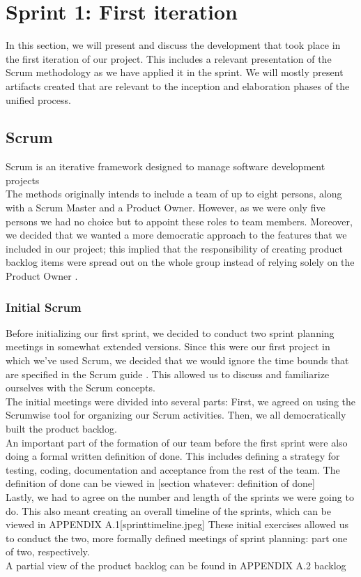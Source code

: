 \section{Sprint 1: First iteration}
In this section, we will present and discuss the development that took place in the first iteration of our project. This includes a relevant presentation of the Scrum methodology as we have applied it in the sprint. We will mostly present artifacts created that are relevant to the inception and elaboration phases of the unified process.
\subsection{Scrum}
Scrum is an iterative framework designed to manage software development projects \cite{scrumguide} \\
The methods originally intends to include a team of up to eight persons, along with a Scrum Master and a Product Owner. However, as we were only five persons we had no choice but to appoint these roles to team members. Moreover, we decided that we wanted a more democratic approach to the features that we included in our project; this implied that the responsibility of creating product backlog items were spread out on the whole group instead of relying solely on the Product Owner \cite[p.~12]{scrumguide}.
\subsubsection{Initial Scrum}
Before initializing our first sprint, we decided to conduct two sprint planning meetings in somewhat extended versions. Since this were our first project in which we’ve used Scrum, we decided that we would ignore the time bounds that are specified in the Scrum guide \cite[p.~9]{scrumguide}. This allowed us to discuss and familiarize ourselves with the Scrum concepts.\\
The initial meetings were divided into several parts: First, we agreed on using the Scrumwise \cite{scrumwise} tool for organizing our Scrum activities. Then, we all democratically built the product backlog. \\
An important part of the formation of our team before the first sprint were also doing a formal written definition of done. This includes defining a strategy for testing, coding, documentation and acceptance from the rest of the team. The definition of done can be viewed in [section whatever: definition of done]\\
Lastly, we had to agree on the number and length of the sprints we were going to do. This also meant creating an overall timeline of the sprints, which can be viewed in APPENDIX A.1[sprinttimeline.jpeg]  These initial exercises allowed us to conduct the two, more formally defined meetings of sprint planning: part one of two, respectively. \\
A partial view of the product backlog can be found in APPENDIX A.2 backlog\\
